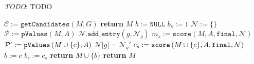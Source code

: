 \begin{algorithm}[H]
    \caption{
        \textit{TODO}: TODO
    }

        \label{expand_group_mutex}
    \begin{algorithmic}[1]
            \State $\mathcal C := \texttt{getCandidates}(M, G)$ 
                \State \textbf{return} $M$
            \EndIf
            \State $b := \texttt{NULL}$ 
            \State $b_s := 1$ 
            \State $\mathcal N := \texttt{\{\}}$
                \State $\mathcal P := \texttt{pValues}(M, A)$
                    \State $\mathcal N.\texttt{add\_entry}(g, \mathcal N_g)$ 
                \EndFor
            \EndIf
            \State $m_s := \texttt{score}(M, A, \texttt{final}, \mathcal N)$ 
                    \State $\mathcal P' := \texttt{pValues}\left(M \cup \{c\}, A\right)$
                        \State $\mathcal N \texttt{[}g\texttt{]} = \mathcal N_g'$ 
                    \EndFor
                \EndIf
                \State $c_s := \texttt{score} \left(M \cup \{c\}, A, \texttt{final}, \mathcal N\right)$ 
                 
                    \State $b := c$
                    \State $b_s := c_s$
                \EndIf
            \EndFor
            \State \textbf{return} $M \cup \{b\}$
        \EndIf
        \State \textbf{return} $M$
        \EndFunction
    \end{algorithmic}
\end{algorithm}

